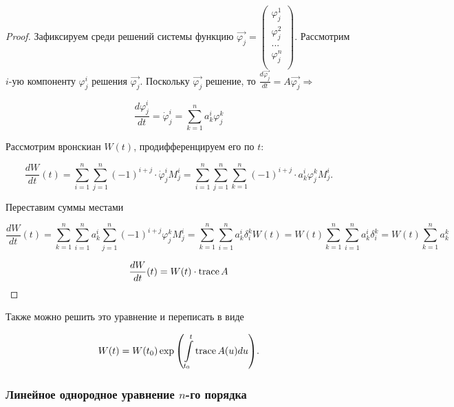\begin{proof}

Зафиксируем среди решений системы функцию $\overrightarrow{\varphi_j}=
\begin{pmatrix}
  \varphi_j^1 \\
  \varphi_j^2 \\
  ...   \\
  \varphi_j^n \\
\end{pmatrix}
$.
Рассмотрим $i$-ую компоненту $\varphi_j^i$ решения $\overrightarrow{\varphi_j}$. Поскольку $\overrightarrow{\varphi_j}$ решение, то $\frac{d\overrightarrow{\varphi_j}}{dt} = A\overrightarrow{\varphi_j} \Rightarrow$

\[\frac{d\varphi_j^i}{dt} = \dot{\varphi}_j^i = \sum\limits_{k = 1}^n{a_k^i \varphi_j^k}\]

Рассмотрим вронскиан $W(t)$, продифференцируем его по $t$:

\[\frac{dW}{dt}(t) = \sum\limits_{i = 1}^n{\sum\limits_{j = 1}^n{(-1)^{i + j} \cdot \dot{\varphi}_j^i M_j^i}} = \sum\limits_{i = 1}^n{\sum\limits_{j = 1}^n{\sum\limits_{k = 1}^n{(-1)^{i + j} \cdot a_k^i \varphi_j^k M_j^i}}}.\]

Переставим суммы местами

\[\frac{dW}{dt}(t) = \sum\limits_{k = 1}^n{\sum\limits_{i = 1}^n{a_k^i}{\sum\limits_{j = 1}^n{(-1)^{i + j} \varphi_j^k M_j^i}}} = \sum\limits_{k = 1}^n{\sum\limits_{i = 1}^n{a_k^i}\delta_i^k W(t)} = W(t)\sum\limits_{k = 1}^n{\sum\limits_{i = 1}^n{a_k^i}\delta_i^k} = W(t)\sum\limits_{k = 1}^n{a_k^k}\]

\[\frac{dW}{dt}(t) = W(t) \cdot \operatorname{trace} A\]

\end{proof}

Также можно решить это уравнение и переписать в виде

\[W(t) = W(t_0)\exp{\left(\int\limits_{t_0}^{t}\operatorname{trace}A(u)du\right)}.\]

\subsubsection{Линейное однородное уравнение $n$-го порядка}

